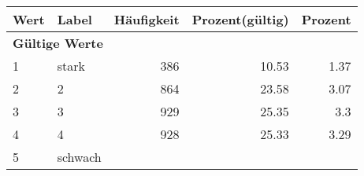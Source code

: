      \begin{longtable}{lXrrr}
     \toprule
     \textbf{Wert} & \textbf{Label} & \textbf{Häufigkeit} & \textbf{Prozent(gültig)} & \textbf{Prozent} \\
     \endhead
     \midrule
     \multicolumn{5}{l}{\textbf{Gültige Werte}}\\

     1 &
     \multicolumn{1}{X}{ stark   } &


       \num{386} &
       \num[round-mode=places,round-precision=2]{10.53} &
         \num[round-mode=places,round-precision=2]{1.37} \\

     2 &
     \multicolumn{1}{X}{ 2   } &


       \num{864} &
       \num[round-mode=places,round-precision=2]{23.58} &
         \num[round-mode=places,round-precision=2]{3.07} \\

     3 &
     \multicolumn{1}{X}{ 3   } &


       \num{929} &
       \num[round-mode=places,round-precision=2]{25.35} &
         \num[round-mode=places,round-precision=2]{3.3} \\

     4 &
     \multicolumn{1}{X}{ 4   } &


       \num{928} &
       \num[round-mode=places,round-precision=2]{25.33} &
         \num[round-mode=places,round-precision=2]{3.29} \\

     5 &
     \multicolumn{1}{X}{ schwach   } &



\end{longtable}
